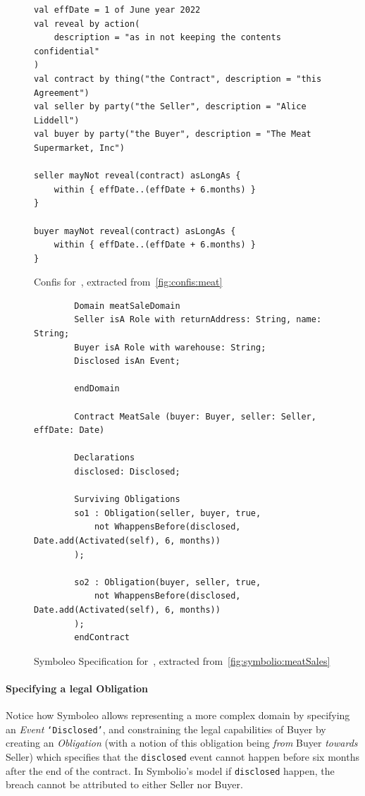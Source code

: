 \begin{figure}[h]
    \centering
    \begin{verbatim}
val effDate = 1 of June year 2022
val reveal by action(
    description = "as in not keeping the contents confidential"
)
val contract by thing("the Contract", description = "this Agreement")
val seller by party("the Seller", description = "Alice Liddell")
val buyer by party("the Buyer", description = "The Meat Supermarket, Inc")

seller mayNot reveal(contract) asLongAs {
    within { effDate..(effDate + 6.months) }
}

buyer mayNot reveal(contract) asLongAs {
    within { effDate..(effDate + 6.months) }
}
    \end{verbatim}
    \caption{Confis for~, extracted from~\autoref{fig:confis:meat}}
    \label{fig:confis:meat-confidentiality}
\end{figure}

\begin{figure}[h]
    \begin{verbatim}
        Domain meatSaleDomain
        Seller isA Role with returnAddress: String, name: String;
        Buyer isA Role with warehouse: String;
        Disclosed isAn Event;

        endDomain

        Contract MeatSale (buyer: Buyer, seller: Seller, effDate: Date)

        Declarations
        disclosed: Disclosed;

        Surviving Obligations
        so1 : Obligation(seller, buyer, true,
            not WhappensBefore(disclosed, Date.add(Activated(self), 6, months))
        );

        so2 : Obligation(buyer, seller, true,
            not WhappensBefore(disclosed, Date.add(Activated(self), 6, months))
        );
        endContract
    \end{verbatim}
    \caption{Symboleo Specification for~, extracted from~\autoref{fig:symbolio:meatSales}}
    \label{fig:symbolio:meatSales-confidentiality}
\end{figure}

\paragraph{Specifying a legal Obligation}
Notice how Symboleo allows representing a more complex domain by specifying an \emph{Event} \texttt{`Disclosed'}, and constraining the legal capabilities of Buyer by creating an \emph{Obligation} (with a notion of this obligation being \emph{from} Buyer \emph{towards} Seller) which specifies that the \texttt{disclosed} event cannot happen before six months after the end of the contract.
In Symbolio's model if \texttt{disclosed} happen, the breach cannot be attributed to either Seller nor Buyer.

